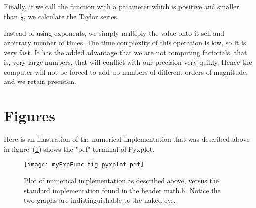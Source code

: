 \documentclass[twocolumn]{article}
\begin{document}
Finally, if we call the function with a parameter which is positive and smaller than $\frac{1}{8}$, we calculate the Taylor series. 


Instead of using exponents, we simply multiply the value onto it self and arbitrary number of times. The time complexity of this
operation is low, so it is very fast. It has the added advantage that we are not computing factorials, that is, very large numbers, that will conflict
with our precision very quikly. Hence the computer will not be forced to add up numbers of different orders of magnitude, and we retain precision.

\section{Figures}
Here is an illustration of the numerical implementation that was described above in figure~(\ref{fig:pyxplot})
shows the "pdf" terminal of Pyxplot.


\begin{figure}[h]
	\texttt{[image: myExpFunc-fig-pyxplot.pdf]}
	\caption{ Plot of numerical implementation as described above, versus the standard implementation found in the header math.h. Notice the two graphs are indistinguishable to the naked eye.}
	\label{fig:pyxplot}
\end{figure}
\end{document}
